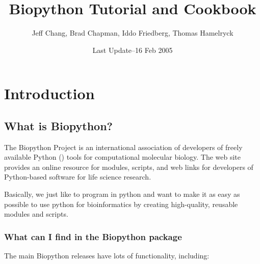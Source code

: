 \documentclass{report}
\begin{document}
\title{Biopython Tutorial and Cookbook}
\author{Jeff Chang, Brad Chapman, Iddo Friedberg, Thomas Hamelryck}
\date{Last Update--16 Feb 2005}

\maketitle
\tableofcontents

\chapter{Introduction}

\section{What is Biopython?}

The Biopython Project is an international association of developers of freely available Python () tools for computational molecular biology. The web site  provides an online resource for modules, scripts, and web links for developers of Python-based software for life science research.


Basically, we just like to program in python and want to make it as easy as possible to use python for bioinformatics by creating high-quality, reusable modules and scripts.

\subsection{What can I find in the Biopython package}

The main Biopython releases have lots of functionality, including:
\end{document}
